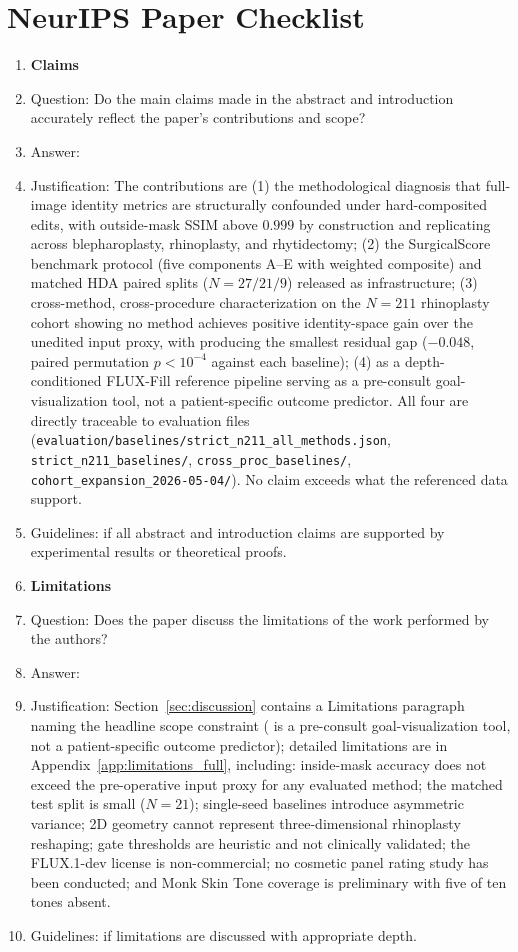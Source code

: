 \section*{NeurIPS Paper Checklist}

\begin{enumerate}

\item {\bf Claims}
    \item[] Question: Do the main claims made in the abstract and introduction accurately reflect the paper's contributions and scope?
    \item[] Answer: \answerYes{}
    \item[] Justification: The contributions are (1) the methodological diagnosis that full-image identity metrics are structurally confounded under hard-composited edits, with outside-mask SSIM above $0.999$ by construction and replicating across blepharoplasty, rhinoplasty, and rhytidectomy; (2) the SurgicalScore benchmark protocol (five components A--E with weighted composite) and matched HDA paired splits ($N{=}27/21/9$) released as infrastructure; (3) cross-method, cross-procedure characterization on the $N{=}211$ rhinoplasty cohort showing no method achieves positive identity-space gain over the unedited input proxy, with \method{} producing the smallest residual gap ($-0.048$, paired permutation $p < 10^{-4}$ against each baseline); (4) \method{} as a depth-conditioned FLUX-Fill reference pipeline serving as a pre-consult goal-visualization tool, not a patient-specific outcome predictor. All four are directly traceable to evaluation files (\texttt{evaluation/baselines/strict\_n211\_all\_methods.json}, \texttt{strict\_n211\_baselines/}, \texttt{cross\_proc\_baselines/}, \texttt{cohort\_expansion\_2026-05-04/}). No claim exceeds what the referenced data support.
    \item[] Guidelines: \answerYes{} if all abstract and introduction claims are supported by experimental results or theoretical proofs.

\item {\bf Limitations}
    \item[] Question: Does the paper discuss the limitations of the work performed by the authors?
    \item[] Answer: \answerYes{}
    \item[] Justification: Section~\ref{sec:discussion} contains a Limitations paragraph naming the headline scope constraint (\method{} is a pre-consult goal-visualization tool, not a patient-specific outcome predictor); detailed limitations are in Appendix~\ref{app:limitations_full}, including: inside-mask accuracy does not exceed the pre-operative input proxy for any evaluated method; the matched test split is small ($N{=}21$); single-seed baselines introduce asymmetric variance; 2D geometry cannot represent three-dimensional rhinoplasty reshaping; gate thresholds are heuristic and not clinically validated; the FLUX.1-dev license is non-commercial; no cosmetic panel rating study has been conducted; and Monk Skin Tone coverage is preliminary with five of ten tones absent.
    \item[] Guidelines: \answerYes{} if limitations are discussed with appropriate depth.


\end{enumerate}

